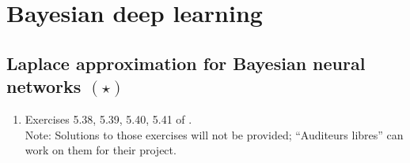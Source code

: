 \documentclass{article}
\begin{document}



\section{Bayesian deep learning}

\subsection{Laplace approximation for Bayesian neural networks $(\star)$}
\begin{enumerate}
\item Exercises 5.38, 5.39, 5.40, 5.41 
of \cite{Bis06}.\\
Note: Solutions to those exercises will not be provided; ``Auditeurs libres'' can work on them for their project.
\end{enumerate}
\end{document}
